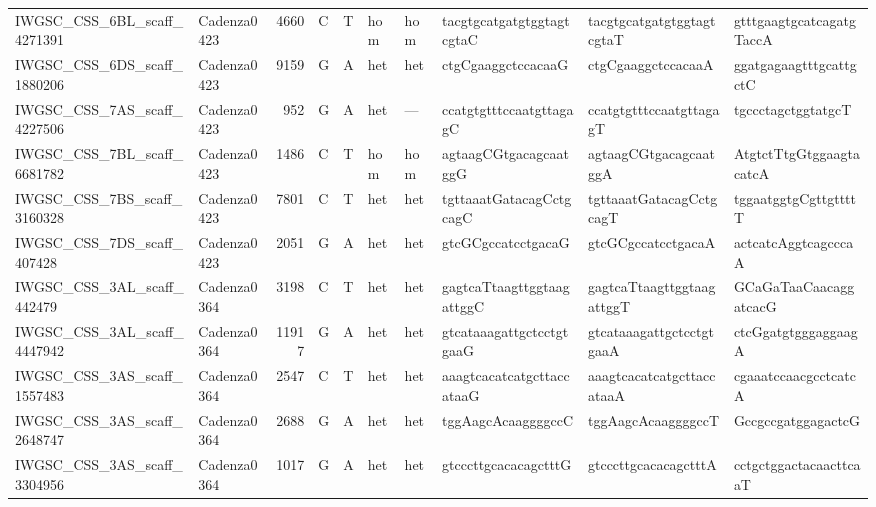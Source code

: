 \begin{tabular}{llrlllllll}
 IWGSC\_CSS\_6BL\_scaff\_4271391  & Cadenza0423 &       4660 & C         & T        & hom            & hom         & tacgtgcatgatgtggtagtcgtaC & tacgtgcatgatgtggtagtcgtaT & gtttgaagtgcatcagatgTaccA  \\
 IWGSC\_CSS\_6DS\_scaff\_1880206  & Cadenza0423 &       9159 & G         & A        & het            & het         & ctgCgaaggctccacaaG        & ctgCgaaggctccacaaA        & ggatgagaagtttgcattgctC    \\
 IWGSC\_CSS\_7AS\_scaff\_4227506  & Cadenza0423 &        952 & G         & A        & het            & ---         & ccatgtgtttccaatgttagagC   & ccatgtgtttccaatgttagagT   & tgccctagctggtatgcT        \\
 IWGSC\_CSS\_7BL\_scaff\_6681782  & Cadenza0423 &       1486 & C         & T        & hom            & hom         & agtaagCGtgacagcaatggG     & agtaagCGtgacagcaatggA     & AtgtctTtgGtggaagtacatcA   \\
 IWGSC\_CSS\_7BS\_scaff\_3160328  & Cadenza0423 &       7801 & C         & T        & het            & het         & tgttaaatGatacagCctgcagC   & tgttaaatGatacagCctgcagT   & tggaatggtgCgttgttttT      \\
 IWGSC\_CSS\_7DS\_scaff\_407428   & Cadenza0423 &       2051 & G         & A        & het            & het         & gtcGCgccatcctgacaG        & gtcGCgccatcctgacaA        & actcatcAggtcagcccaA       \\
 IWGSC\_CSS\_3AL\_scaff\_442479   & Cadenza0364 &       3198 & C         & T        & het            & het         & gagtcaTtaagttggtaagattggC & gagtcaTtaagttggtaagattggT & GCaGaTaaCaacaggatcacG     \\
 IWGSC\_CSS\_3AL\_scaff\_4447942  & Cadenza0364 &      11917 & G         & A        & het            & het         & gtcataaagattgctcctgtgaaG  & gtcataaagattgctcctgtgaaA  & ctcGgatgtgggaggaagA       \\
 IWGSC\_CSS\_3AS\_scaff\_1557483  & Cadenza0364 &       2547 & C         & T        & het            & het         & aaagtcacatcatgcttaccataaG & aaagtcacatcatgcttaccataaA & cgaaatccaacgcctcatcA      \\
 IWGSC\_CSS\_3AS\_scaff\_2648747  & Cadenza0364 &       2688 & G         & A        & het            & het         & tggAagcAcaaggggccC        & tggAagcAcaaggggccT        & GccgccgatggagactcG        \\
 IWGSC\_CSS\_3AS\_scaff\_3304956  & Cadenza0364 &       1017 & G         & A        & het            & het         & gtcccttgcacacagctttG      & gtcccttgcacacagctttA      & cctgctggactacaacttcaaT    \\

\end{tabular}
